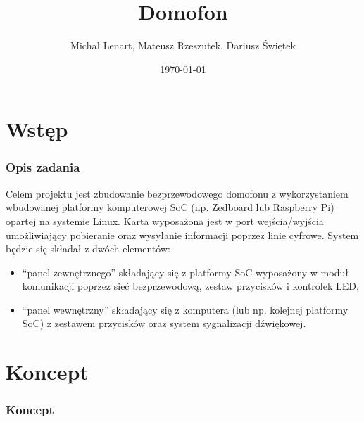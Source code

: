 \documentclass[presentation, 10pt]{beamer}
\institute[IS]{Informatyka Stosowana}
\author[M. Lenart, M. Rzeszutek, D. Świętek]{Michał Lenart, Mateusz Rzeszutek, Dariusz Świętek}
\title{Domofon}
\date{\today}
\begin{document}
\maketitle






\section{Wstęp}
\label{sec-1}
\begin{frame}
\frametitle{Opis zadania}
\label{sec-1-1}

Celem projektu jest zbudowanie bezprzewodowego domofonu z wykorzystaniem wbudowanej
platformy komputerowej SoC (np. Zedboard lub Raspberry Pi) opartej na systemie Linux. Karta
wyposażona jest w port wejścia/wyjścia umożliwiający pobieranie oraz wysyłanie informacji
poprzez linie cyfrowe. System będzie się składał z dwóch elementów:
\begin{itemize}
\item ``panel zewnętrznego'' składający się z platformy SoC wyposażony w moduł komunikacji
  poprzez sieć bezprzewodową, zestaw przycisków i kontrolek LED,
\item ``panel wewnętrzny'' składający się z komputera (lub np. kolejnej platformy SoC) z
  zestawem przycisków oraz system sygnalizacji dźwiękowej.
\end{itemize}
\end{frame}
\section{Koncept}
\label{sec-2}
\begin{frame}
\frametitle{Koncept}
\label{sec-2-1}

\end{frame}
\end{document}
